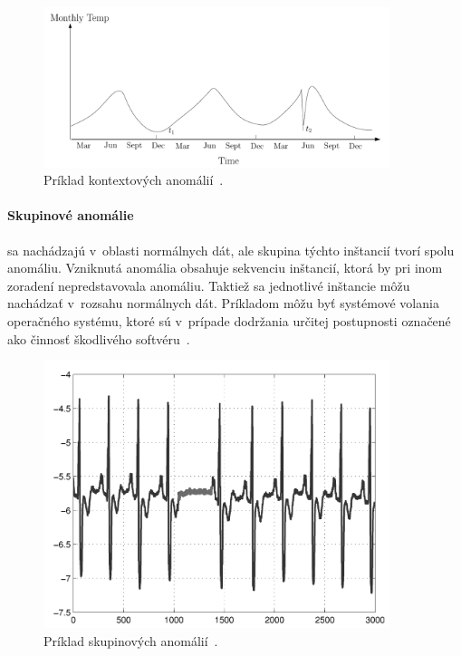 \documentclass[a4paper,twoside,slovak,12pt,appendix]{article}
\begin{document}
\begin{figure}[htbp]
  \centering
  \includegraphics[width=0.9\textwidth]{contextual_anomalies.png}
  \caption[Príklad kontextových anomálií.]{Príklad kontextových anomálií~\cite{Chandola2009}.}
  \label{fig:contextual-anomalies}
\end{figure}

\paragraph{Skupinové anomálie} sa nachádzajú v~oblasti normálnych dát, ale
skupina týchto inštancií tvorí spolu anomáliu. Vzniknutá anomália obsahuje
sekvenciu inštancií, ktorá by pri inom zoradení nepredstavovala anomáliu.
Taktiež sa jednotlivé inštancie môžu nachádzať v~rozsahu normálnych dát.
Príkladom môžu byť systémové volania operačného systému, ktoré sú v~prípade
dodržania určitej postupnosti označené ako činnosť škodlivého
softvéru~\cite{Goldberger2000}.

\begin{figure}[H]
  \centering
  \includegraphics[width=0.9\textwidth]{collective_anomalies.png}
  \caption[Príklad skupinových anomálií.]{Príklad skupinových anomálií~\cite{Chandola2009}.}
  \label{fig:collective-anomalies}
\end{figure}
\end{document}
